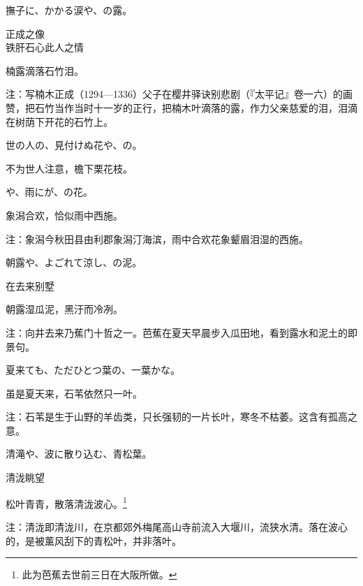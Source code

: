 \begin{haiku}
    {\FH 撫子に、かかる涙や、の露。}

    {\FK 正成之像\\铁肝石心此人之情}

    {\FK 楠露滴落石竹泪。}

    {\FT 注：写楠木正成（1294—1336）父子在樱井驿诀别悲剧（『太平记』卷一六）的画赞，把石竹当作当时十一岁的正行，把楠木叶滴落的露，作力父亲慈爱的泪，泪滴在树荫下开花的石竹上。}
\end{haiku}

\begin{haiku}
    {\FH 世の人の、見付けぬ花や、の。}

    {\FK 不为世人注意，檐下栗花枝。}
\end{haiku}

\begin{haiku}
    {\FH {}や、雨にが、の花。}

    {\FK 象潟合欢，恰似雨中西施。}

    {\FT 注：象潟今秋田县由利郡象潟汀海滨，雨中合欢花象颦眉泪湿的西施。}
\end{haiku}

\begin{haiku}
    {\FH 朝露や、よごれて涼し、の泥。}

    {\FK 在去来别墅}

    {\FK 朝露湿瓜泥，黑汙而冷冽。}

    {\FT 注：向井去来乃蕉门十哲之一。芭蕉在夏天早晨步入瓜田地，看到露水和泥土的即景句。}
\end{haiku}

\begin{haiku}
    {\FH 夏来ても、ただひとつ葉の、一葉かな。}

    {\FK 虽是夏天来，石苇依然只一叶。}

    {\FT 注：石苇是生于山野的羊齿类，只长强韧的一片长叶，寒冬不枯萎。这含有孤高之意。}
\end{haiku}

\begin{haiku}
    {\FH 清滝や、波に散り込む、青松葉。}

    {\FK 清泷眺望}

    {\FK 松叶青青，散落清泷波心。\footnote{\FT 此为芭蕉去世前三日在大阪所做。}}

    {\FT 注：清泷即清泷川，在京都郊外梅尾高山寺前流入大堰川，流狭水清。落在波心的，是被薰风刮下的青松叶，并非落叶。}
\end{haiku}

